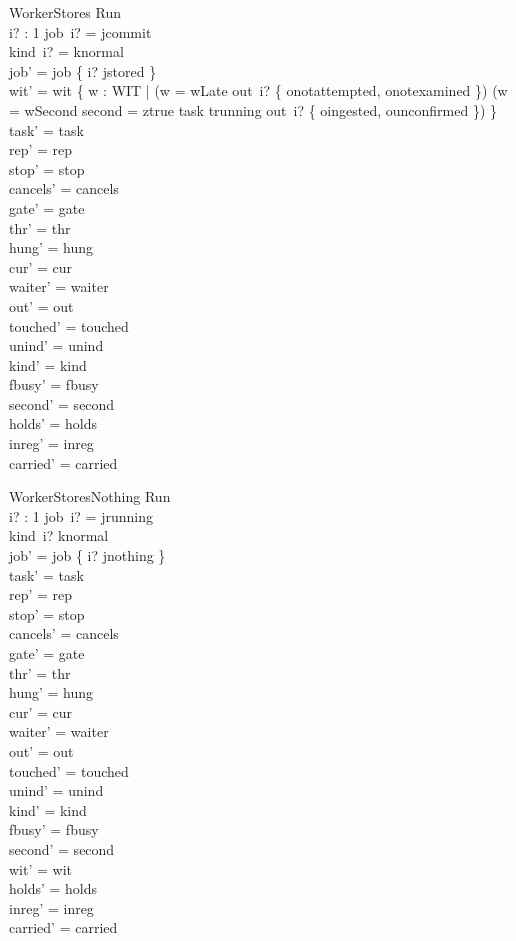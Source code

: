 \documentclass[a4paper,10pt,fleqn]{article}
\begin{document}
\begin{schema}{WorkerStores}
\Delta Run \\ i? : 1 
\where
job~i? = jcommit \\
kind~i? = knormal \\
job' = job \oplus \{ i? \mapsto jstored \} \\
wit' = wit \cup \{ w : WIT | (w = wLate \land out~i? \in \{ onotattempted, onotexamined \}) \lor (w = wSecond \land second = ztrue \land task \neq trunning \land out~i? \notin \{ oingested, ounconfirmed \}) \} \\
task' = task \\
rep' = rep \\
stop' = stop \\
cancels' = cancels \\
gate' = gate \\
thr' = thr \\
hung' = hung \\
cur' = cur \\
waiter' = waiter \\
out' = out \\
touched' = touched \\
unind' = unind \\
kind' = kind \\
fbusy' = fbusy \\
second' = second \\
holds' = holds \\
inreg' = inreg \\
carried' = carried
\end{schema}

\begin{schema}{WorkerStoresNothing}
\Delta Run \\ i? : 1 
\where
job~i? = jrunning \\
kind~i? \neq knormal \\
job' = job \oplus \{ i? \mapsto jnothing \} \\
task' = task \\
rep' = rep \\
stop' = stop \\
cancels' = cancels \\
gate' = gate \\
thr' = thr \\
hung' = hung \\
cur' = cur \\
waiter' = waiter \\
out' = out \\
touched' = touched \\
unind' = unind \\
kind' = kind \\
fbusy' = fbusy \\
second' = second \\
wit' = wit \\
holds' = holds \\
inreg' = inreg \\
carried' = carried
\end{schema}
\end{document}
